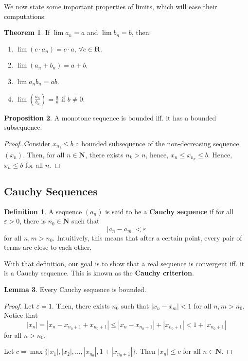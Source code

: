 \documentclass[tikz,12pt,a4paper]{article}
\theoremstyle{definition}
\newtheorem{theorem}{Theorem}[section]
\newtheorem{lemma}[theorem]{Lemma}
\newtheorem{proposition}[theorem]{Proposition}
\newtheorem{definition}{Definition}[section]
\begin{document}
We now state some important properties of limits, which will ease their computations. 

\begin{theorem}
	If $\lim a_n = a$ and $\lim b_n = b$, then:
	\begin{enumerate}
		\item $\lim (c \cdot a_n) = c \cdot a$, $\forall c \in \textbf{R}$.
		\item $\lim (a_n + b_n) = a + b$.
		\item $\lim a_n b_n = ab$.
		\item $\lim \left( \frac{a_n}{b_n} \right) = \frac{a}{b}$ if $b \neq 0$.
	\end{enumerate}
\end{theorem}

\begin{proposition}
	A monotone sequence is bounded iff. it has a bounded subsequence.
\end{proposition}

\begin{proof}
	Consider $x_{n_j} \leq b$ a bounded subsequence of the non-decreasing sequence $(x_n)$. Then, for all $n \in \textbf{N}$, there exists $n_k > n$, hence, $x_n \leq x_{n_k} \leq b$. Hence, $x_n \leq b$ for all $n$. 
\end{proof}

\subsection{Cauchy Sequences}

\begin{definition}
	A sequence $(a_n)$ is said to be a \textbf{Cauchy sequence} if for all $\varepsilon > 0$, there is $n_0 \in \textbf{N}$ such that 
	\[
		| a_n - a_m | < \varepsilon
	\]
	for all $n,m > n_0$. Intuitively, this means that after a certain point, every pair of terms are close to each other.
\end{definition}

With that definition, our goal is to show that a real sequence is convergent iff. it is a Cauchy sequence. This is known as the \textbf{Cauchy criterion}.

\begin{lemma}
	Every Cauchy sequence is bounded.
\end{lemma}

\begin{proof}
	Let $\varepsilon = 1$. Then, there exists $n_0$ such that $|x_n - x_m| < 1$ for all $n,m > n_0$. Notice that
	\[ |x_n| = |x_n - x_{n_0+1} + x_{n_0+1}| \leq |x_n - x_{n_0+1}| + |x_{n_0+1}| < 1 +  |x_{n_0+1}| \]
	for all $n > n_0$.
	
	Let $c = \max \{|x_1|, |x_2|, \ldots, |x_{n_0}|, 1+|x_{n_0+1}|\}$. Then $|x_n| \leq c$ for all $n \in \textbf{N}$.
\end{proof}
\end{document}
